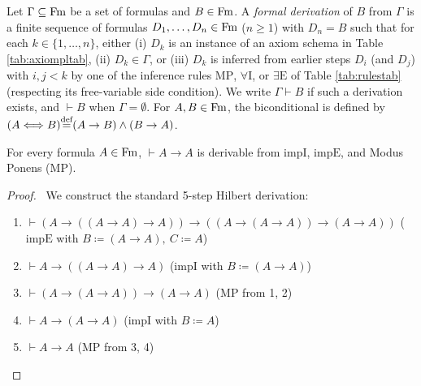 \documentclass[10pt,a4paper]{article}
\renewcommand{\myprf}{\begin{proof}}
\renewcommand{\myqed}{\end{proof}}
\begin{document}
\begin{definition}\label{def:hilbert_deriv}
Let $\Gamma \subseteq {\textrm{Fm}}$ be a set of formulas and $B \in {\textrm{Fm}}$. A \emph{formal derivation} of $B$ from $\Gamma$ is a finite sequence of formulas $D_1, \dots, D_n \in {\textrm{Fm}}$ ($n \ge 1$) with $D_n = B$ such that for each $k \in \{1, \dots, n\}$, either (i) $D_k$ is an instance of an axiom schema in Table \ref{tab:axiompltab}, (ii) $D_k \in \Gamma$, or (iii) $D_k$ is inferred from earlier steps $D_i$ (and $D_j$) with $i, j < k$ by one of the inference rules $\textrm{MP}$, $\forall\textrm{I}$, or $\exists\textrm{E}$ of Table \ref{tab:rulestab} (respecting its free-variable side condition). We write $\Gamma \vdash B$ if such a derivation exists, and $\vdash B$ when $\Gamma = \emptyset$. For $A, B \in {\textrm{Fm}}$, the biconditional is defined by $(A \Longleftrightarrow B) {\stackrel{{\textrm{def}}}{=}} (A \to B) \land (B \to A)$.
\end{definition}

\begin{lemma}\label{lem:id_law}
For every formula $A \in {\textrm{Fm}}$, $\vdash A \to A$ is derivable from $\textrm{impI}$, $\textrm{impE}$, and Modus Ponens ($\textrm{MP}$).
\end{lemma}
\myprf\ We construct the standard 5-step Hilbert derivation:
\begin{enumerate}
\item $\vdash (A \to ((A \to A) \to A)) \to ((A \to (A \to A)) \to (A \to A))$ \hfill ($\textrm{impE}$ with $B \coloneqq (A \to A),\ C \coloneqq A$)
\item $\vdash A \to ((A \to A) \to A)$ \hfill ($\textrm{impI}$ with $B \coloneqq (A \to A)$)
\item $\vdash (A \to (A \to A)) \to (A \to A)$ \hfill ($\textrm{MP}$ from 1, 2)
\item $\vdash A \to (A \to A)$ \hfill ($\textrm{impI}$ with $B \coloneqq A$)
\item $\vdash A \to A$ \hfill ($\textrm{MP}$ from 3, 4)
\end{enumerate}
\myqed
\end{document}
